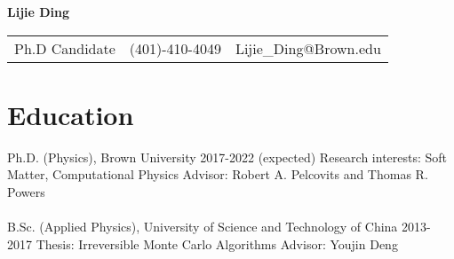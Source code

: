 \documentclass[10pt,letterpaper]{article}
\begin{document}
\pagestyle{headings}

\begin{center}
    \Large{\textbf{Lijie Ding}} \\
\end{center}
\begin{center}
    \begin{tabular}{l l l}
        Ph.D Candidate & (401)-410-4049 & Lijie\_Ding@Brown.edu
    \end{tabular}
\end{center}


\section*{Education}
Ph.D. (Physics), Brown University \hfill 2017-2022 (expected)\newline
Research interests: Soft Matter, Computational Physics \newline
Advisor: Robert A. Pelcovits and Thomas R. Powers
\\~\\
B.Sc. (Applied Physics), University of Science and Technology of China \hfill 2013-2017\newline
Thesis: Irreversible Monte Carlo Algorithms \newline
Advisor: Youjin Deng
\end{document}
